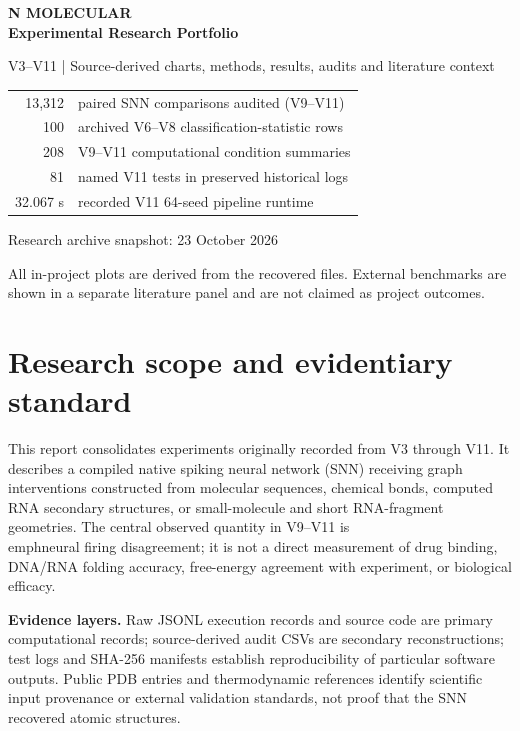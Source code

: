 \documentclass[11pt,a4paper]{article}
\begin{document}
\begin{titlepage}
\centering\vspace*{24mm}
{\Huge\bfseries\color{ink} N MOLECULAR\\[5pt] Experimental Research Portfolio\par}
\vspace{8mm}
{\Large V3--V11 | Source-derived charts, methods, results, audits and literature context\par}
\vspace{22mm}
\begin{tabular}{rl}
13,312 & paired SNN comparisons audited (V9--V11)\\
100 & archived V6--V8 classification-statistic rows\\
208 & V9--V11 computational condition summaries\\
81 & named V11 tests in preserved historical logs\\
32.067 s & recorded V11 64-seed pipeline runtime
\end{tabular}
\vfill
{\large Research archive snapshot: 23 October 2026}\par
\vspace{4mm}
{\small All in-project plots are derived from the recovered files. External benchmarks are shown in a separate literature panel and are not claimed as project outcomes.}\par
\end{titlepage}
\tableofcontents\clearpage

\section{Research scope and evidentiary standard}
This report consolidates experiments originally recorded from V3 through V11. It describes a compiled native spiking neural network (SNN) receiving graph interventions constructed from molecular sequences, chemical bonds, computed RNA secondary structures, or small-molecule and short RNA-fragment geometries. The central observed quantity in V9--V11 is \\emph{neural firing disagreement}; it is not a direct measurement of drug binding, DNA/RNA folding accuracy, free-energy agreement with experiment, or biological efficacy.

\textbf{Evidence layers.} Raw JSONL execution records and source code are primary computational records; source-derived audit CSVs are secondary reconstructions; test logs and SHA-256 manifests establish reproducibility of particular software outputs. Public PDB entries and thermodynamic references identify scientific input provenance or external validation standards, not proof that the SNN recovered atomic structures.
\end{document}
